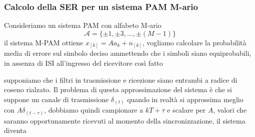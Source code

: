         \subsubsection{Calcolo della SER per un sistema PAM M-ario}
            Consideriamo un sistema PAM con alfabeto M-ario
            \[
                \mathcal{A} = \{\pm 1,\pm 3,\dots, \pm(M-1)\}  
            \]
            il sistema M-PAM ottiene $x_{[k]} = Aa_k + n_{[k]}$,
            vogliamo calcolare la probabilità media di errore sul simbolo deciso ammettendo che i simboli 
            siano equiprobabili, in assenza di ISI all'ingresso del ricevitore così fatto
            \begin{figure}[H]
                \centering
            \end{figure}                    
            supponiamo che i filtri in trasmissione e ricezione siano entrambi a radice di coseno rialzato. Il problema di questa 
            approssimazione del sistema è che si suppone un canale di trasmissione $\delta_{(t)}$ quando in realtà si approssima
            meglio con $A\delta_{(t-\tau)}$, dobbiamo quindi campionare a $kT+\tau$ e scalare per $A$, valori che saranno 
            opportunamente ricevuti al momento della sincronizzazione, il sistema diventa 
